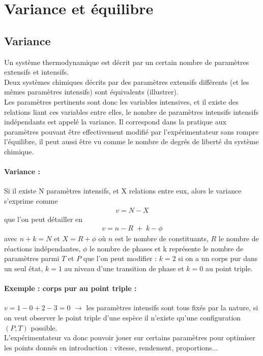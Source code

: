 \documentclass[12pt,prb,aps,epsf]{report}
\begin{document}
\section{Variance et équilibre}
\subsection{Variance}
Un système thermodynamique est décrit par un certain nombre de paramètres extensifs et intensifs.\\
Deux systèmes chimiques décrits par des paramètres extensifs différents (et les mêmes paramètres intensifs) sont équivalents (illustrer).\\
Les paramètres pertinents sont donc les variables intensives, et il existe des relations liant ces variables entre elles, le nombre de paramètres intensifs intensifs indépendants est appelé la variance. Il correspond dans la pratique aux paramètres pouvant être effectivement modifié par l'expérimentateur sans rompre l'équilibre, il peut aussi être vu comme le nombre de degrés de liberté du système chimique.
\paragraph{Variance :} Si il existe N paramètres intensifs, et X relations entre eux, alors le variance s'exprime comme
\begin{eqnarray}
v = N - X
\end{eqnarray}
que l'on peut détailler en 
\begin{eqnarray}
v = n-R \;+\; k - \phi
\end{eqnarray}
avec $n+k = N$ et $X = R+\phi$ où $n$ est le nombre de constituants, $R$ le nombre de réactions indépendantes, $\phi$ le nombre de phases et k représente le nombre de paramètres parmi $T$ et $P$ que l'on peut modifier : $k=2$ si on a un corps pur dans un seul état, $k=1$ au niveau d'une transition de phase et $k=0$ au point triple.
\paragraph{Exemple : corps pur au point triple :} $v = 1 - 0 + 2 - 3 = 0$ $\longrightarrow$ les paramètres intensifs sont tous fixés par la nature, si on veut observer le point triple d'une espèce il n'existe qu'une configuration $(P,T)$ possible.\\

L'expérimentateur va donc pouvoir jouer sur certains paramètres pour optimiser les points donnés en introduction : vitesse, rendement, proportions...\\
\end{document}
